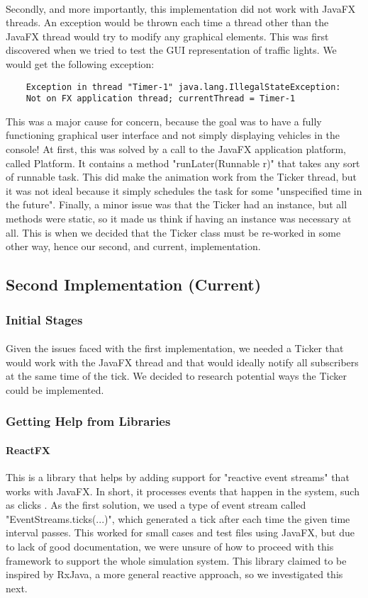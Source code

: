 \documentclass[a4paper,11pt,titlepage]{article}
\begin{document}
\paragraph{}
Secondly, and more importantly, this implementation did not work with JavaFX threads. An exception would be thrown each time a thread other than the JavaFX thread would try to modify any graphical elements. This was first discovered when we tried to test the GUI representation of traffic lights. We would get the following exception:
\begin{lstlisting}
	Exception in thread "Timer-1" java.lang.IllegalStateException:
	Not on FX application thread; currentThread = Timer-1
\end{lstlisting}
This was a major cause for concern, because the goal was to have a fully functioning graphical user interface and not simply displaying vehicles in the console! At first, this was solved by a call to the JavaFX application platform, called Platform. It contains a method "runLater(Runnable r)" that takes any sort of runnable task. This did make the animation work from the Ticker thread, but it was not ideal because it simply schedules the task for some "unspecified time in the future". Finally, a minor issue was that the Ticker had an instance, but all methods were static, so it made us think if having an instance was necessary at all. This is when we decided that the Ticker class must be re-worked in some other way, hence our second, and current, implementation.
\subsection{Second Implementation (Current)}
\subsubsection{Initial Stages}
\paragraph{}
Given the issues faced with the first implementation, we needed a Ticker that would work with the JavaFX thread and that would ideally notify all subscribers at the same time of the tick. We decided to research potential ways the Ticker could be implemented.
\subsubsection{Getting Help from Libraries}
\paragraph{ReactFX}
This is a library that helps by adding support for "reactive event streams" that works with JavaFX. In short, it processes events that happen in the system, such as clicks \cite{reactfx}. As the first solution, we used a type of event stream called "EventStreams.ticks(...)", which generated a tick after each time the given time  interval passes. This worked for small cases and test files using JavaFX, but due to lack of good documentation, we were unsure of how to proceed with this framework to support the whole simulation system. This library claimed to be inspired by RxJava, a more general reactive approach, so we investigated this next.
\end{document}
